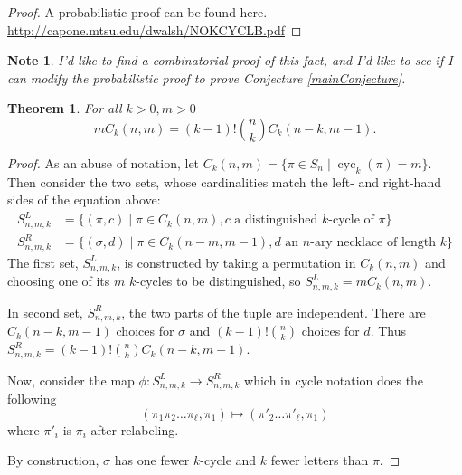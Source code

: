 \documentclass{article}
\numberwithin{equation}{subsection}
\newtheorem{theorem}[theo]{Theorem}
\newtheorem{note}[theo]{Note}
\newtheorem{todo}[theo]{To Do}
\begin{document}
\begin{proof}
  A probabilistic proof can be found here.
  \url{http://capone.mtsu.edu/dwalsh/NOKCYCLB.pdf}
\end{proof}
\begin{note}
  I'd like to find a combinatorial proof of this fact, and I'd like to see if
  I can modify the probabilistic proof to prove Conjecture \ref{mainConjecture}.
\end{note}
\begin{theorem}
  \label{cycRecurrence}
  For all $k > 0, m > 0$ \begin{equation}
    mC_k(n, m) = (k-1)!\binom{n}{k}C_k(n-k, m-1).
  \end{equation}
\end{theorem}
\begin{proof}
  As an abuse of notation, let $C_k(n, m) = \{ \pi \in S_n \mid \operatorname{cyc}_k(\pi) = m\}$.
  Then consider the two sets, whose cardinalities match the left- and
  right-hand sides of the equation above:
  \begin{align}
    S^{L}_{n,m,k} &= \{ (\pi, c) \mid \pi \in C_k(n, m), c \text{ a distinguished } k\text{-cycle of } \pi \} \\
    S^{R}_{n,m,k} &= \{ (\sigma, d) \mid \pi \in C_k(n-m, m-1), d \text{ an } n\text{-ary necklace of length } k\}
  \end{align}
  The first set, $S^{L}_{n,m,k}$, is constructed by taking a permutation in
  $C_k(n,m)$ and choosing one of its $m$ $k$-cycles to be distinguished, so
  $S^{L}_{n,m,k} = mC_k(n,m)$.

  In second set, $S^{R}_{n,m,k}$, the two parts of the tuple are independent.
  There are $C_k(n-k, m-1)$ choices for $\sigma$ and $(k-1)!\binom{n}{k}$
  choices for $d$. Thus $S^{R}_{n,m,k} = (k-1)!\binom{n}{k}C_k(n-k, m-1)$.

  Now, consider the map $\phi \colon S^{L}_{n,m,k} \rightarrow S^{R}_{n,m,k}$
  which in cycle notation does the following \begin{equation}
    (\pi_1\pi_2 \dots \pi_\ell, \pi_1) \mapsto (\pi'_2 \dots \pi'_\ell, \pi_1)
  \end{equation} where $\pi'_i$ is $\pi_i$ after relabeling.

  By construction, $\sigma$ has one fewer $k$-cycle and $k$ fewer letters
  than $\pi$.
\end{proof}
\end{document}
